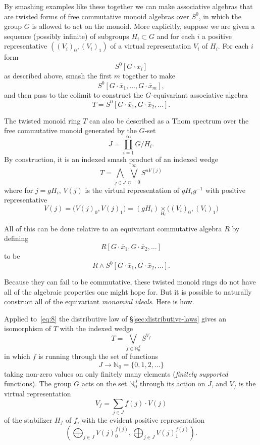 \documentclass{amsart}
\theoremstyle{definition}
\theoremstyle{remark}
\newcommand{\gbar}{\bar}
\newcommand{\nat}{\mathbb N_{0}}
\begin{document}
By smashing examples like these together we can make associative
algebras that are twisted forms of free commutative
monoid algebras over $S^{0}$, in which the group $G$ is allowed to act
on the monoid.  More explicitly, suppose we are given a sequence
(possibly infinite) of subgroups $H_{i}\subset G$ and for each $i$ a
positive representative $((V_{i})_{0}, (V_{i})_{1})$ of a virtual
representation $V_{i}$ of $H_{i}$.  For each $i$ form
\[
S^{0}[G \cdot \gbar{x}_{i}]
\]
as described above, smash the first $m$ together to make
\[
S^{0}[G\cdot\gbar{x}_{1},\dots,G\cdot\gbar{x}_{m}],
\]
and then pass to the  colimit to construct the $G$-equivariant
associative algebra
\[
T=S^{0}[G\cdot\gbar{x}_{1},G\cdot\gbar{x}_{2},\dots].
\]

The twisted monoid ring $T$ can also be described as
a Thom spectrum over the free commutative monoid generated by the
$G$-set
\[
J=\coprod_{i=1}^{\infty} G/H_{i}.
\]
By construction, it is an indexed smash product of an indexed wedge
\begin{equation}
\label{eq:8}
T = \bigwedge_{j\in J}\bigvee_{n=0}^{\infty} S^{n V(j)}
\end{equation}
where for $j= g H_{i}$, $V(j)$ is the virtual representation of $g
H_{i}g^{-1}$ with positive representative
\[
V(j) = \big(V(j)_{0},
V(j)_{1}\big) = 
(g H_{i})\underset{H_{i}}{\times}\big((V_{i})_{0}, (V_{i})_{1}\big)
\]


All of this can be done relative to an equivariant commutative algebra
$R$ by defining
\[
R[G\cdot\gbar{x}_{1},G\cdot\gbar{x}_{2},\dots]
\]
to be
\[
R\wedge S^{0}[G\cdot\gbar{x}_{1},G\cdot\gbar{x}_{2},\dots].
\]

Because they can fail to be commutative, these twisted
monoid rings do not have all of the algebraic properties one might
hope for.  But it is possible to naturally construct all of the
equivariant {\em monomial ideals}.  Here is how.

Applied to~\eqref{eq:8} the distributive law of
\S\ref{sec:distributive-laws} gives an isomorphism of $T$ with the
indexed wedge
\[
T=\bigvee_{f\in \nat^{J}} S^{V_{f}}
\]
in which $f$ is running through the set of 
functions 
\[
J\to \nat = \{0,1,2,\dots \}
\]
taking non-zero values on only finitely many elements ({\em finitely
supported} functions).  The group $G$ acts on the set $\nat^{J}$
through its action on $J$, and $V_{f}$ is the virtual representation
\[
V_{f}=\sum_{j\in J}f(j)\cdot V(j)
\]
of the stabilizer $H_{f}$ of $f$, with the evident positive representation
\[
\left(\bigoplus_{j\in J}V(j)_{0}^{f(j)},\bigoplus_{j\in J}V(j)_{1}^{f(j)}\right).
\]
\end{document}
